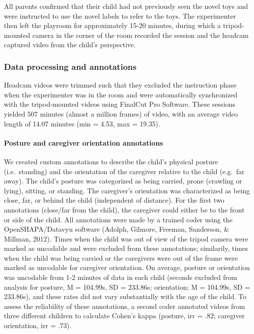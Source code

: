 \documentclass[english,man]{apa6}
\begin{document}
All parents confirmed that their child had not previously seen the novel
toys and were instructed to use the novel labels to refer to the toys.
The experimenter then left the playroom for approximately 15-20 minutes,
during which a tripod-mounted camera in the corner of the room recorded
the session and the headcam captured video from the child's perspective.

\subsubsection{Data processing and
annotations}\label{data-processing-and-annotations}

Headcam videos were trimmed such that they excluded the instruction
phase when the experimenter was in the room and were automatically
synchronized with the tripod-mounted videos using FinalCut Pro Software.
These sessions yielded 507 minutes (almost a million frames) of video,
with an average video length of 14.07 minutes (min = 4.53, max = 19.35).

\paragraph{Posture and caregiver orientation
annotations}\label{posture-and-caregiver-orientation-annotations}

We created custom annotations to describe the child's physical posture
(i.e.~standing) and the orientation of the caregiver relative to the
child (e.g.~far away). The child's posture was categorized as being
carried, prone (crawling or lying), sitting, or standing. The
caregiver's orientation was characterized as being close, far, or behind
the child (independent of distance). For the first two annotations
(close/far from the child), the caregiver could either be to the front
or side of the child. All annotations were made by a trained coder using
the OpenSHAPA/Datavyu software (Adolph, Gilmore, Freeman, Sanderson, \&
Millman, 2012). Times when the child was out of view of the tripod
camera were marked as uncodable and were excluded from these
annotations; similarily, times when the child was being carried or the
caregivers were out of the frame were marked as uncodable for caregiver
orientation. On average, posture or orientation was uncodable from 1-2
minutes of data in each child (seconds excluded from analysis for
posture, M = 104.99s, SD = 233.86s; orientation; M = 104.99s, SD =
233.86s), and these rates did not vary substantially with the age of the
child. To assess the reliability of these annotations, a second coder
annotated videos from three different children to calculate Cohen's
kappa (posture, irr = .82; caregiver orientation, irr = .73).
\end{document}
